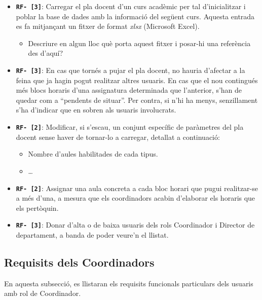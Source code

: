 \documentclass[a4paper,12pt]{ThesisStyle}
\begin{document}
\begin{itemize}
  \item \texttt{\textbf{RF- [3]}}: Carregar el pla docent d'un curs acadèmic per tal d'inicialitzar i poblar la base de dades amb la informació del següent curs. Aquesta entrada es fa mitjançant un fitxer de format \emph{xlsx} (Microsoft Excel).
    \begin{itemize}
      \item Descriure en algun lloc què porta aquest fitxer i posar-hi una referència des d'aquí?
    \end{itemize}
  \item \texttt{\textbf{RF- [3]}}: En cas que tornés a pujar el pla docent, no hauria d'afectar a la feina que ja hagin pogut realitzar altres usuaris. En cas que el nou contingués més blocs horaris d'una assignatura determinada que l'anterior, s'han de quedar com a ``pendents de situar''. Per contra, si n'hi ha menys, senzillament s'ha d'indicar que en sobren als usuaris involucrats.
  \item \texttt{\textbf{RF- [2]}}: Modificar, si s'escau, un conjunt específic de paràmetres del pla docent sense haver de tornar-lo a carregar, detallat a continuació:
    \begin{itemize}
      \item Nombre d'aules habilitades de cada tipus.
      \item \ldots
    \end{itemize}
  \item \texttt{\textbf{RF- [2]}}: Assignar una aula concreta a cada bloc horari que pugui realitzar-se a més d'una, a mesura que els coordinadors acabin d'elaborar els horaris que els pertòquin.
  \item \texttt{\textbf{RF- [3]}}: Donar d'alta o de baixa usuaris dels rols Coordinador i Director de departament, a banda de poder veure'n el llistat.
\end{itemize}

\subsection{Requisits dels Coordinadors}
\label{subsec:requisits_coordinadors}

En aquesta subsecció, es llistaran els requisits funcionals particulars dels usuaris amb rol de Coordinador.
\end{document}

